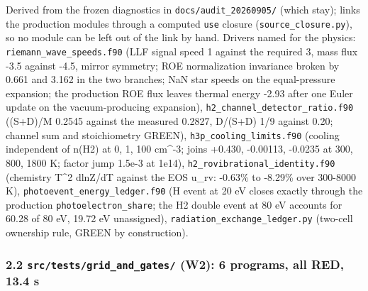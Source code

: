 \documentclass[english,a4paper]{my_memo}
\begin{document}
Derived from the frozen diagnostics in \texttt{docs/audit\_20260905/} (which stay);
links the production modules through a computed \texttt{use} closure
(\texttt{source\_closure.py}), so no module can be left out of the link by hand.
Drivers named for the physics: \texttt{riemann\_wave\_speeds.f90} (LLF signal speed
1 against the required 3, mass flux -3.5 against -4.5, mirror symmetry; ROE
normalization invariance broken by 0.661 and 3.162 in the two branches; NaN
star speeds on the equal-pressure expansion; the production ROE flux leaves
thermal energy -2.93 after one Euler update on the vacuum-producing
expansion), \texttt{h2\_channel\_detector\_ratio.f90} ((S+D)/M 0.2545 against the
measured 0.2827, D/(S+D) 1/9 against 0.20; channel sum and stoichiometry
GREEN), \texttt{h3p\_cooling\_limits.f90} (cooling independent of n(H2) at 0, 1,
100 cm\^{}-3; joins +0.430, -0.00113, -0.0235 at 300, 800, 1800 K; factor
jump 1.5e-3 at 1e14), \texttt{h2\_rovibrational\_identity.f90} (chemistry
T\^{}2 dlnZ/dT against the EOS u\_rv: -0.63\% to -8.29\% over 300-8000 K),
\texttt{photoevent\_energy\_ledger.f90} (H event at 20 eV closes exactly through the
production \texttt{photoelectron\_share}; the H2 double event at 80 eV accounts for
60.28 of 80 eV, 19.72 eV unassigned), \texttt{radiation\_exchange\_ledger.py} (two-cell
ownership rule, GREEN by construction).

\subsubsection{\texorpdfstring{2.2 \texttt{src/tests/grid\_and\_gates/} (W2): 6 programs, all RED, 13.4 s}{2.2 src/tests/grid\_and\_gates/ (W2): 6 programs, all RED, 13.4 s}}\label{22-srctestsgrid_and_gates-w2-6-programs-all-red-134-s}
\end{document}
